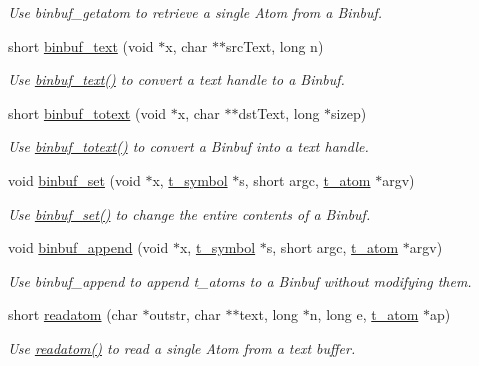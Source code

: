 \begin{DoxyCompactItemize}
\begin{DoxyCompactList}\small\item\em Use binbuf\_\-getatom to retrieve a single Atom from a Binbuf. \item\end{DoxyCompactList}\item 
short \hyperlink{group__binbuf_ga7a582c876ee074505762b30c7eef6504}{binbuf\_\-text} (void $\ast$x, char $\ast$$\ast$srcText, long n)
\begin{DoxyCompactList}\small\item\em Use \hyperlink{group__binbuf_ga7a582c876ee074505762b30c7eef6504}{binbuf\_\-text()} to convert a text handle to a Binbuf. \item\end{DoxyCompactList}\item 
short \hyperlink{group__binbuf_ga739086c676dfaba01dff1f70e7487dd5}{binbuf\_\-totext} (void $\ast$x, char $\ast$$\ast$dstText, long $\ast$sizep)
\begin{DoxyCompactList}\small\item\em Use \hyperlink{group__binbuf_ga739086c676dfaba01dff1f70e7487dd5}{binbuf\_\-totext()} to convert a Binbuf into a text handle. \item\end{DoxyCompactList}\item 
void \hyperlink{group__binbuf_ga716d66a159b96b7b9d87baaab33367e0}{binbuf\_\-set} (void $\ast$x, \hyperlink{structt__symbol}{t\_\-symbol} $\ast$s, short argc, \hyperlink{structt__atom}{t\_\-atom} $\ast$argv)
\begin{DoxyCompactList}\small\item\em Use \hyperlink{group__binbuf_ga716d66a159b96b7b9d87baaab33367e0}{binbuf\_\-set()} to change the entire contents of a Binbuf. \item\end{DoxyCompactList}\item 
void \hyperlink{group__binbuf_ga57f584204ff1860c93ca728ca991fb15}{binbuf\_\-append} (void $\ast$x, \hyperlink{structt__symbol}{t\_\-symbol} $\ast$s, short argc, \hyperlink{structt__atom}{t\_\-atom} $\ast$argv)
\begin{DoxyCompactList}\small\item\em Use binbuf\_\-append to append t\_\-atoms to a Binbuf without modifying them. \item\end{DoxyCompactList}\item 
short \hyperlink{group__binbuf_gacb42118a4da090a6d47954f8b299de46}{readatom} (char $\ast$outstr, char $\ast$$\ast$text, long $\ast$n, long e, \hyperlink{structt__atom}{t\_\-atom} $\ast$ap)
\begin{DoxyCompactList}\small\item\em Use \hyperlink{group__binbuf_gacb42118a4da090a6d47954f8b299de46}{readatom()} to read a single Atom from a text buffer. \item\end{DoxyCompactList}\end{DoxyCompactItemize}


